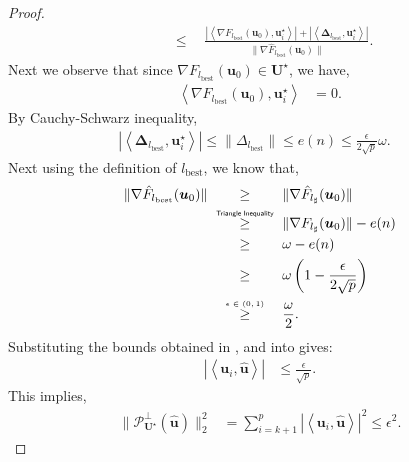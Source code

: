 \documentclass[final,12pt]{colt2018} %
\newcommand{\explain}[2]{\mathrel{\overset{\makebox[0pt]{\mbox{\normalfont\tiny\sffamily #1}}}{#2}}}
\renewcommand\v[1]{{\ensuremath{\boldsymbol{#1}}}}
\newcommand\ip[1]{\left\langle #1 \right\rangle}
\begin{document}
\begin{proof}
\begin{align}
    & \quad \leq \quad \frac{|\ip{\nabla F_{l_\text{best}}(\v u_0),\v u_i^\star}|+|\ip{\v \Delta_{l_\text{best}},\v u_i^\star}|}{\| \nabla \hat{F}_{l_\text{best}}(\v u_0)\|}. \label{eq: multiindex_algo_eq_1}
\end{align}
Next we observe that since $\nabla F_{l_\text{best}}(\v u_0) \in \mathcal{\v U}^\star$, we have,
\begin{align}
\ip{\nabla F_{l_\text{best}}(\v u_0),\v u_i^\star}&=0.
\label{eq: multiindex_algo_eq_2}
\end{align}
By Cauchy-Schwarz inequality,  
\begin{align}
|\ip{\v \Delta_{l_\text{best}},\v u_i^\star}|  \leq \|\Delta_{l_\text{best}}\| \leq e(n) \leq \frac{\epsilon}{2\sqrt{p}} \omega. & \label{eq: multiindex_algo_eq_3}
\end{align}
Next using the definition of $l_\text{best}$, we know that,
\begin{align}
    \| \nabla \hat{F}_{l_\text{best}}(\v u_0) \| & \qquad \geq \qquad  \| \nabla \hat{F}_{l_\sharp}(\v u_0) \| \nonumber \\
    & \qquad \explain{Triangle Inequality}{\geq} \qquad \| \nabla F_{l_\sharp}(\v u_0) \| - e(n) \\
    & \qquad \geq \qquad \omega - e(n) \nonumber \\
    & \qquad \geq \qquad \omega \left(1-\frac{\epsilon}{2\sqrt{p}}\right) \nonumber \\
     & \qquad \explain{$\epsilon \in (0,1)$}{\geq} \qquad \frac{\omega}{2}. \label{eq: multiindex_algo_eq_4}
\end{align}
Substituting the bounds obtained in ,  and  into  gives:
\begin{align*}
    |\ip{\v u_i, \hat{\v u}}| & \leq \frac{\epsilon}{\sqrt{p}}.
\end{align*}
This implies,
\begin{align*}
    \|\mathcal{P}^\perp_{\mathcal{\v U}^\star} (\hat{\v u}) \|_2^2 & = \sum_{i=k+1}^p |\ip{\v u_i, \hat{\v u}}|^2 \leq \epsilon^2.
\end{align*}
\end{proof}
\end{document}
